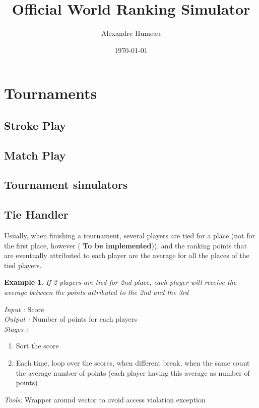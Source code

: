 \documentclass{article}
\newtheorem{example}{Example}[section]
\begin{document}
\title{Official World Ranking Simulator}
\author{Alexandre Humeau}
\date{\today}
\maketitle
\clearpage

\tableofcontents
\clearpage

\section{Tournaments}
\subsection{Stroke Play}
\subsection{Match Play}
\subsection{Tournament simulators}

\subsection{Tie Handler}
Usually, when finishing a tournament, several players are tied for a place (not for the first place, however (\textbf{\color{orange} To be implemented})), and the ranking points that are eventually attributed to each player are the average for all the places of the tied players.

\begin{example}
	If 2 players are tied for 2nd place, each player will receive the average between the points attributed to the 2nd and the 3rd
\end{example}

\emph{Input : } Score\\
\emph{Output : } Number of points for each players\\

\emph{Stages : }
\begin{enumerate}
	\item Sort the score
	\item Each time, loop over the scores, when different break, when the same count the average number of points (each player having this average as number of points)
\end{enumerate}

\emph{Tools:} Wrapper around vector to avoid access violation exception
\end{document}
